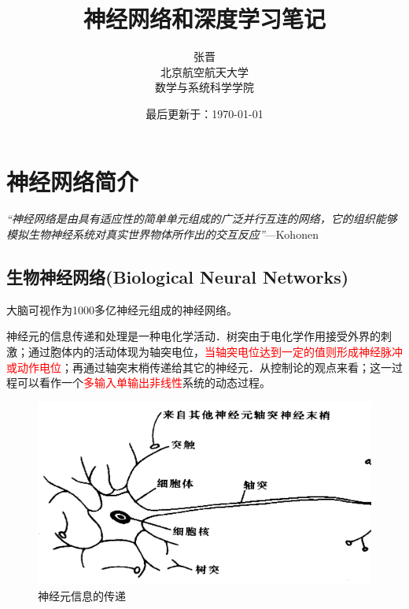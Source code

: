 



\title{神经网络和深度学习笔记}
\author{张晋\\北京航空航天大学\\数学与系统科学学院}
\date{最后更新于：\today}


\maketitle

\tableofcontents


\newpage

\chapter{神经网络简介}
\textit{“神经网络是由具有适应性的简单单元组成的广泛并行互连的网络，它的组织能够模拟生物神经系统对真实世界物体所作出的交互反应”}---Kohonen

\newpage
\section{生物神经网络(Biological Neural Networks)}
大脑可视作为1000多亿神经元组成的神经网络。

神经元的信息传递和处理是一种电化学活动．树突由于电化学作用接受外界的刺激；通过胞体内的活动体现为轴突电位，\textcolor{red}{当轴突电位达到一定的值则形成神经脉冲或动作电位}；再通过轴突末梢传递给其它的神经元．从控制论的观点来看；这一过程可以看作一个\textcolor{red}{多输入单输出非线性}系统的动态过程。


\begin{figure}[h]
\small
\centering
\includegraphics[width=14cm]{figure//1.png}
\caption{神经元信息的传递} \label{fig:1}
\end{figure}


